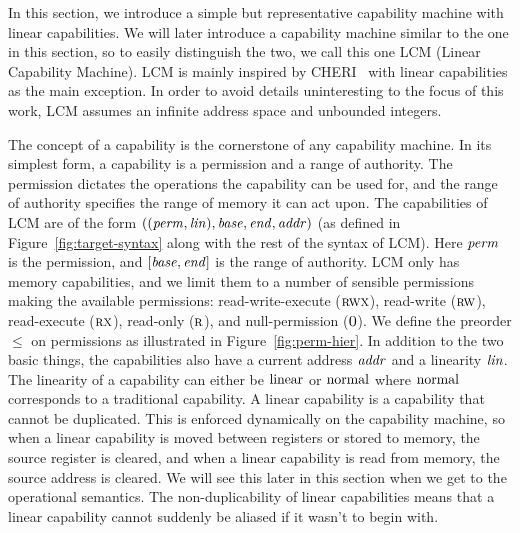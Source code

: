 \documentclass[acmsmall,review,anonymous]{acmart}\settopmatter{printfolios=true,printccs=false,printacmref=false}
\newcommand{\trgcm}{\textsc{LCM}}
\begin{document}
In this section, we introduce a simple but representative capability machine with linear capabilities.
We will later introduce a capability machine similar to the one in this section, so to easily distinguish the two, we call this one \trgcm{} (Linear Capability Machine).
\trgcm{} is mainly inspired by CHERI~\citep{watson_cheri:_2015} with linear capabilities as the main exception.
In order to avoid details uninteresting to the focus of this work, \trgcm{} assumes an infinite address space and unbounded integers.

The concept of a capability is the cornerstone of any capability machine.
In its simplest form, a capability is a permission and a range of authority.
The permission dictates the operations the capability can be used for, and the range of authority specifies the range of memory it can act upon.
The capabilities of \trgcm{} are of the form $((\mathit{perm},\mathit{lin}),\mathit{base},\mathit{end},\mathit{addr})$ (as defined in Figure~\ref{fig:target-syntax} along with the rest of the syntax of \trgcm{}). Here $\mathit{perm}$ is the permission, and $[\mathit{base},\mathit{end}]$ is the range of authority.
\trgcm{} only has memory capabilities, and we limit them to a number of sensible permissions making the available permissions: read-write-execute ($\textsc{rwx}$), read-write ($\textsc{rw}$), read-execute ($\textsc{rx}$), read-only ($\textsc{r}$), and null-permission ($\textsc{0}$).
We define the preorder $\le$ on permissions as illustrated in Figure~\ref{fig:perm-hier}.
In addition to the two basic things, the capabilities also have a current address $\mathit{addr}$ and a linearity $\mathit{lin}$. The linearity of a capability can either be $\mathrm{linear}$ or $\mathrm{normal}$ where $\mathrm{normal}$ corresponds to a traditional capability.
A linear capability is a capability that cannot be duplicated.
This is enforced dynamically on the capability machine, so when a linear capability is moved between registers or stored to memory, the source register is cleared, and when a linear capability is read from memory, the source address is cleared.
We will see this later in this section when we get to the operational semantics.
The non-duplicability of linear capabilities means that a linear capability cannot suddenly be aliased if it wasn't to begin with.
\end{document}
